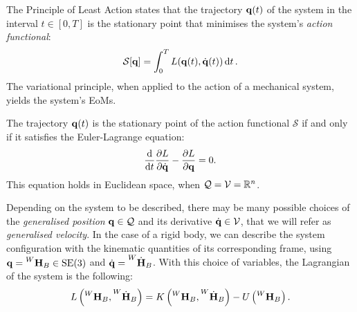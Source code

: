 \begin{definition*}
%
The Principle of Least Action states that the trajectory $\Qu(t)$ of the system in the interval $t \in [0, T]$ is the stationary point that minimises the system's \emph{action functional}:
\begin{equation*}
    \mathcal{S}[\Qu] = \int_{0}^{T} L(\Qu(t), \Qud(t)) \dd{t}
    .
\end{equation*}
The variational principle, when applied to the action of a mechanical system, yields the system's \aclp{EoM}.
%
\end{definition*}

\begin{definition*}
\label{definition:euler_lagrange}
%
The trajectory $\Qu(t)$ is the stationary point of the action functional $\mathcal{S}$ if and only if it satisfies the Euler-Lagrange equation:
\begin{equation}
    \label{eq:euler_lagrange}
    \dv{t} \pdv{L}{\Qud} - \pdv{L}{\Qu} = 0
    .
\end{equation}
%
This equation holds in Euclidean space, when $\mathcal{Q} = \mathcal{V} = \realn^n$.
%
\end{definition*}

Depending on the system to be described, there may be many possible choices of the \emph{generalised position} $\Qu \in \mathcal{Q}$ and its derivative $\Qud \in \mathcal{V}$, that we will refer as \emph{generalised velocity}.
In the case of a rigid body, we can describe the system configuration with the kinematic quantities of its corresponding frame, \ie using $\Qu = \homo[W]_B \in \SE(3)$ and $\Qud = \homod[W]_B$.
With this choice of variables, the Lagrangian of the system is the following:
%
\begin{equation*}
    L \left( \homo[W]_B, \homod[W]_B \right) = K \left( \homo[W]_B, \homod[W]_B \right) - U \left( \homo[W]_B \right).
\end{equation*}

